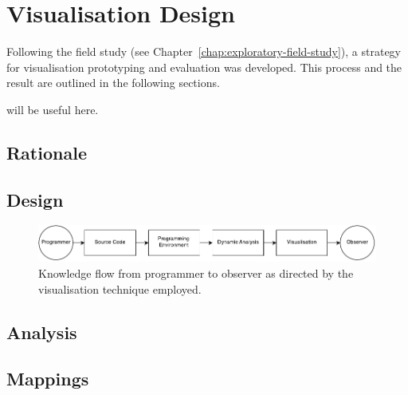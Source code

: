
\chapter{Visualisation Design}
\label{chap:visualisation-design}

Following the field study (see Chapter~\ref{chap:exploratory-field-study}), a strategy for visualisation prototyping and evaluation was developed. This process and the result are outlined in the following sections.

{\color{red}\cite{Ware2013a,McLean2010a,Purchase1996} will be useful here.}

\section{Rationale}



\section{Design}

\begin{figure}
  \centering \includegraphics[width=\columnwidth]{../images/diagrams/knowledge-flow-initial.pdf}
  \caption{Knowledge flow from programmer to observer as directed by the visualisation technique employed.}
\label{fig:knowledge-flow-initial}
\end{figure}

\section{Analysis}

\section{Mappings}